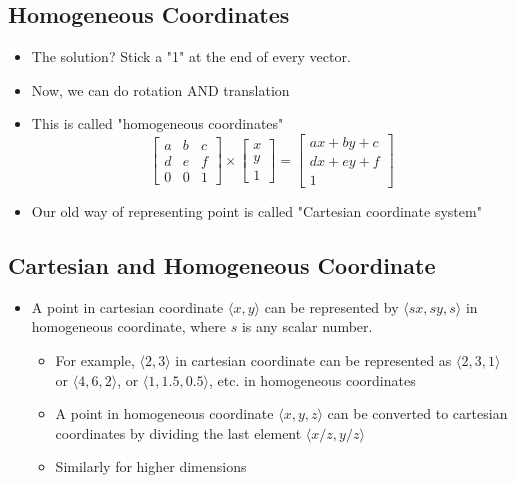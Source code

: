 \documentclass[10pt]{article}
\begin{document}
\subsection*{Homogeneous Coordinates}
\begin{itemize}
	\item The solution?  Stick a "1" at the end of every vector.
	\item Now, we can do rotation AND translation
	\item This is called "homogeneous coordinates"
	\[\begin{bmatrix} a & b & c \\ d & e & f \\ 0 & 0 & 1 \end{bmatrix} \times \begin{bmatrix} x \\ y \\ 1 \end{bmatrix} = \begin{bmatrix} ax + by + c \\ dx + ey + f \\ 1 \end{bmatrix}\]
    \item Our old way of representing point is called "Cartesian coordinate system"
\end{itemize}

\subsection*{Cartesian and Homogeneous Coordinate}
\begin{itemize}
	\item A point in cartesian coordinate $\langle x, y \rangle$ can be represented by $\langle sx, sy, s \rangle$ in homogeneous coordinate, where $s$ is any scalar number.
	\begin{itemize}
        \item For example, $\langle 2, 3 \rangle$ in cartesian coordinate can be represented as $\langle 2, 3, 1 \rangle$ or $\langle 4, 6, 2 \rangle$, or $\langle 1, 1.5, 0.5\rangle$, etc. in homogeneous coordinates
        \item A point in homogeneous coordinate $\langle x, y, z \rangle$ can be converted to cartesian coordinates by dividing the last element $\langle x/z, y/z \rangle$
        \item Similarly for higher dimensions
    \end{itemize}
\end{itemize}
\end{document}
